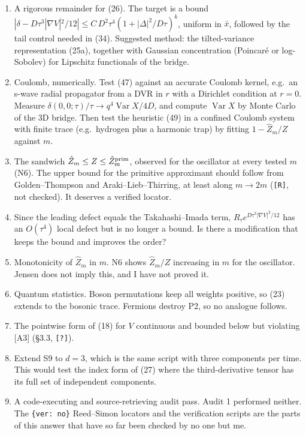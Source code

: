 \documentclass[11pt,a4paper]{article}
\begin{document}
\begin{enumerate}
\def\labelenumi{\arabic{enumi}.}
\item
  A rigorous remainder for (26). The target is a bound \(|\delta-D\tau^3|\nabla V|^2/12|\le C\,D^2\tau^4(1+|\Delta|^2/D\tau)^k\), uniform in \(\bar x\), followed by the tail control needed in (34). Suggested method: the tilted-variance representation (25a), together with Gaussian concentration (Poincaré or log-Sobolev) for Lipschitz functionals of the bridge.
\item
  Coulomb, numerically. Test (47) against an accurate Coulomb kernel, e.g.~an s-wave radial propagator from a DVR in \(r\) with a Dirichlet condition at \(r=0\). Measure \(\delta(0,0;\tau)/\tau\to q^4\operatorname{Var}X/4D\), and compute \(\operatorname{Var}X\) by Monte Carlo of the 3D bridge. Then test the heuristic (49) in a confined Coulomb system with finite trace (e.g.~hydrogen plus a harmonic trap) by fitting \(1-\hat Z_m/Z\) against \(m\).
\item
  The sandwich \(\hat Z_m\le Z\le\hat Z^{\rm prim}_m\), observed for the oscillator at every tested \(m\) (N6). The upper bound for the primitive approximant should follow from Golden--Thompson and Araki--Lieb--Thirring, at least along \(m\to2m\) (\texttt{[R]}, not checked). It deserves a verified locator.
\item
  Since the leading defect equals the Takahashi--Imada term, \(R_\tau e^{D\tau^3|\nabla V|^2/12}\) has an \(O(\tau^4)\) local defect but is no longer a bound. Is there a modification that keeps the bound and improves the order?
\item
  Monotonicity of \(\hat Z_m\) in \(m\). N6 shows \(\hat Z_m/Z\) increasing in \(m\) for the oscillator. Jensen does not imply this, and I have not proved it.
\item
  Quantum statistics. Boson permutations keep all weights positive, so (23) extends to the bosonic trace. Fermions destroy P2, so no analogue follows.
\item
  The pointwise form of (18) for \(V\) continuous and bounded below but violating {[}A3{]} (§3.3, \texttt{[?]}).
\item
  Extend S9 to \(d=3\), which is the same script with three components per time. This would test the index form of (27) where the third-derivative tensor has its full set of independent components.
\item
  A code-executing and source-retrieving audit pass. Audit 1 performed neither. The \texttt{\{ver: no\}} Reed--Simon locators and the verification scripts are the parts of this answer that have so far been checked by no one but me.
\end{enumerate}
\end{document}
